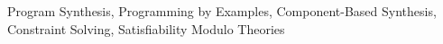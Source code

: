 Program Synthesis, Programming by Examples, Component-Based Synthesis,
Constraint Solving, Satisfiability Modulo Theories
